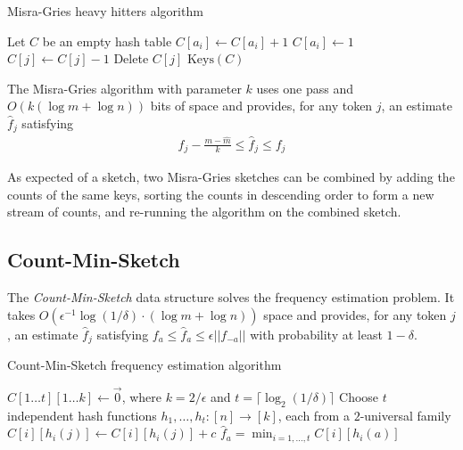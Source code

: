 \documentclass{article}
\begin{document}
\begin{algorithm}
  \caption{Misra-Gries heavy hitters algorithm}
  \begin{algorithmic}[1]
    \State Let $C$ be an empty hash table
    \State $C[a_i] \leftarrow C[a_i] + 1$
    \State $C[a_i] \leftarrow 1$
    \Else
    \State $C[j] \leftarrow C[j] - 1$
     \State Delete $C[j]$ \EndIf
    \EndFor
    \EndIf
    \EndFor
    \State \Return $\text{Keys}(C)$
    \EndProcedure
  \end{algorithmic}
\end{algorithm}

\begin{lemma}
  The Misra-Gries algorithm with parameter $k$ uses one pass and $O(k(\log m + \log n))$ bits of space and provides, for any token $j$, an estimate $\hat{f}_j$ satisfying
  \begin{align}
    f_j - \frac{m - \hat{m}}{k} \le \hat{f}_j \le f_j
  \end{align}
\end{lemma}

As expected of a sketch, two Misra-Gries sketches can be combined by adding the counts of the same keys, sorting the counts in descending order to form a new stream of counts, and re-running the algorithm on the combined sketch.

\subsection{Count-Min-Sketch}

The \emph{Count-Min-Sketch} data structure solves the frequency estimation problem.
It takes $O(\epsilon^{-1} \log (1 / \delta) \cdot (\log m + \log n))$ space and provides, for any token $j$, an estimate $\hat{f}_j$ satisfying $f_a \leq \hat{f}_a \leq \epsilon || f_{-a} ||$ with probability at least $1 - \delta$.

\begin{algorithm}
  \caption{Count-Min-Sketch frequency estimation algorithm}
  \begin{algorithmic}[1]
    \Require $C[1 \ldots t][1 \ldots k] \leftarrow \vec{0}$, where $k = 2 / \epsilon$ and $t = \lceil{\log_2(1 / \delta)}\rceil$
    \Require Choose $t$ independent hash functions $h_1, \ldots, h_t \colon [n] \to [k]$, each from a $2$-universal family
    \State $C[i][h_i(j)] \leftarrow C[i][h_i(j)] + c$
    \EndFor
    \EndFor
    \EndProcedure
    \State \Return $\hat{f}_a = \min_{i = 1, \ldots, t} C[i][h_i(a)]$
    \EndProcedure
  \end{algorithmic}
\end{algorithm}
\end{document}
